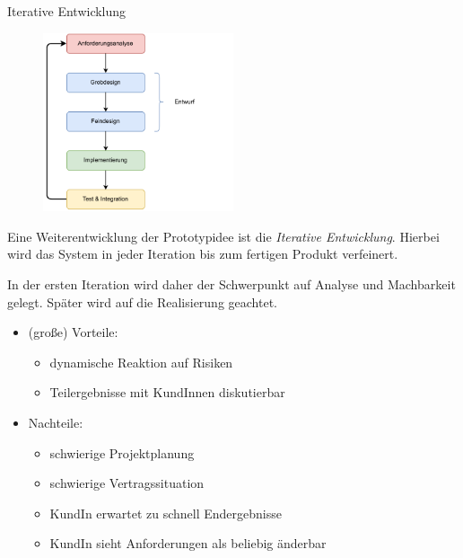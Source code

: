 \begin{defi}{Iterative Entwicklung}
    \begin{figure}
        \begin{center}
            \includegraphics[width=0.5\textwidth]{includes/figures/01_iterative_development.pdf}
        \end{center}
    \end{figure}

    Eine Weiterentwicklung der Prototypidee ist die \emph{Iterative Entwicklung}.
    Hierbei wird das System in jeder Iteration bis zum fertigen Produkt verfeinert.

    In der ersten Iteration wird daher der Schwerpunkt auf Analyse und Machbarkeit gelegt.
    Später wird auf die Realisierung geachtet.

    \begin{itemize}
        \item (große) Vorteile:
              \begin{itemize}
                  \item dynamische Reaktion auf Risiken
                  \item Teilergebnisse mit KundInnen diskutierbar
              \end{itemize}
        \item Nachteile:
              \begin{itemize}
                  \item schwierige Projektplanung
                  \item schwierige Vertragssituation
                  \item KundIn erwartet zu schnell Endergebnisse
                  \item KundIn sieht Anforderungen als beliebig änderbar
              \end{itemize}
    \end{itemize}
\end{defi}

